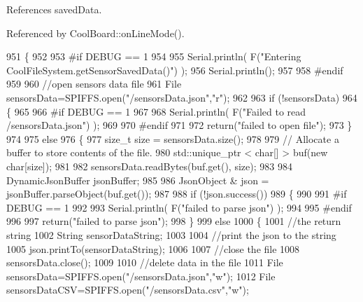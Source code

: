 References saved\+Data.



Referenced by Cool\+Board\+::on\+Line\+Mode().


\begin{DoxyCode}
951 \{
952 
953 \textcolor{preprocessor}{#if DEBUG == 1 }
954 
955     Serial.println( F(\textcolor{stringliteral}{"Entering CoolFileSystem.getSensorSavedData()"}) );
956     Serial.println();
957 
958 \textcolor{preprocessor}{#endif}
959 
960     \textcolor{comment}{//open sensors data file}
961     File sensorsData=SPIFFS.open(\textcolor{stringliteral}{"/sensorsData.json"},\textcolor{stringliteral}{"r"});
962     
963     \textcolor{keywordflow}{if} (!sensorsData)
964     \{
965 
966 \textcolor{preprocessor}{    #if DEBUG == 1 }
967 
968         Serial.println( F(\textcolor{stringliteral}{"Failed to read /sensorsData.json"}) );
969 
970 \textcolor{preprocessor}{    #endif}
971  
972         \textcolor{keywordflow}{return}(\textcolor{stringliteral}{"failed to open file"});
973     \}
974 
975     \textcolor{keywordflow}{else}
976     \{
977         \textcolor{keywordtype}{size\_t} size = sensorsData.size();
978 
979         \textcolor{comment}{// Allocate a buffer to store contents of the file.}
980         std::unique\_ptr < char[] > buf(\textcolor{keyword}{new} \textcolor{keywordtype}{char}[size]);
981 
982         sensorsData.readBytes(buf.get(), size);
983 
984         DynamicJsonBuffer jsonBuffer;
985 
986         JsonObject & json = jsonBuffer.parseObject(buf.get());
987         
988         \textcolor{keywordflow}{if} (!json.success())
989         \{
990 
991 \textcolor{preprocessor}{        #if DEBUG == 1}
992         
993             Serial.println( F(\textcolor{stringliteral}{"failed to parse json"}) );
994         
995 \textcolor{preprocessor}{        #endif}
996         
997             \textcolor{keywordflow}{return}(\textcolor{stringliteral}{"failed to parse json"});
998         \}
999         \textcolor{keywordflow}{else}
1000         \{   
1001             \textcolor{comment}{//the return string}
1002             String sensorDataString;
1003             
1004             \textcolor{comment}{//print the json to the string}
1005             json.printTo(sensorDataString);
1006             
1007             \textcolor{comment}{//close the file}
1008             sensorsData.close();
1009 
1010             \textcolor{comment}{//delete data in the file}
1011             File sensorsData=SPIFFS.open(\textcolor{stringliteral}{"/sensorsData.json"},\textcolor{stringliteral}{"w"});
1012             File sensorsDataCSV=SPIFFS.open(\textcolor{stringliteral}{"/sensorsData.csv"},\textcolor{stringliteral}{"w"});

\end{DoxyCode}
